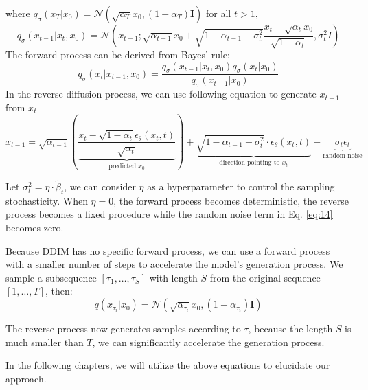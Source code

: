 where $q_\sigma(x_T|x_0) = \mathcal{N}(\sqrt{\alpha_T}x_0, (1 - \alpha_T)\textbf{I})$ for all $t > 1$,
\begin{equation} \label{eq:12}
    q_\sigma(x_{t-1} | x_t, x_0) = \mathcal{N}(x_{t-1}; \sqrt{\alpha_{t-1}}x_0 + \sqrt{1 - \alpha_{t-1} - \sigma_t^2} \frac{x_t - \sqrt{\alpha_t}x_0}{\sqrt{1 - \alpha_t}}, \sigma_t^2I)
\end{equation}
The forward process can be derived from Bayes' rule:
\begin{equation} \label{eq:13}
        q_\sigma(x_t | x_{t-1}, x_0) = \frac{q_\sigma(x_{t-1} | x_t, x_0)q_\sigma(x_t | x_0)}{q_\sigma(x_{t-1}|x_0)}
\end{equation}
In the reverse diffusion process, we can use following equation to generate $x_{t-1}$ from $x_t$
\begin{equation} \label{eq:14}
    x_{t-1} = \sqrt{\alpha_{t-1}}(\underbrace{\frac{x_t - \sqrt{1 - \alpha_t}\epsilon_\theta(x_t, t)}{\sqrt{\alpha_t}}}_{\text{predicted $x_0$}}) + \underbrace{\sqrt{1 - \alpha_{t-1} - \sigma_t^2} \cdot \epsilon_\theta(x_t, t)}_{\text{direction pointing to $x_t$}} + \underbrace{\sigma_t\epsilon_t}_{\text{random noise}}
\end{equation}

Let $\sigma_t^2 = \eta \cdot \tilde{\beta}_t$, we can consider $\eta$ as a hyperparameter to control the sampling stochasticity. When $\eta = 0$, the forward process becomes deterministic, the reverse process becomes a fixed procedure while the random noise term in Eq. \ref{eq:14} becomes zero.

Because DDIM has no specific forward process, we can use a forward process with a smaller number of steps to accelerate the model's generation process. We sample a subsequence $[\tau_1, \dots, \tau_S]$ with length $S$ from the original sequence $[1, \dots, T]$, then:
\begin{equation}
    q(x_{\tau_i}|x_0) = \mathcal{N}(\sqrt{\alpha_{\tau_i}}x_0, (1 - \alpha_{\tau_i})\textbf{I})
\end{equation}

The reverse process now generates samples according to $\tau$, because the length $S$ is much smaller than $T$, we can significantly accelerate the generation process.


In the following chapters, we will utilize the above equations to elucidate our approach.
